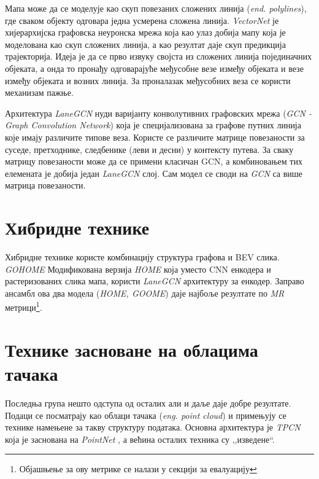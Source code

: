 \documentclass[11pt,oneside]{memoir}
\begin{document}
Мапа може да се моделује као скуп повезаних сложених линија (\textit{end. polylines}), где сваком објекту одговара једна усмерена сложена линија. 
\textit{VectorNet} је хијерархијска графовска неуронска мрежа која као улаз добија мапу која је моделована као скуп 
сложених линија, а као резултат даје скуп предикција трајекторија. Идеја је да се прво извуку својста из сложених 
линија појединачних објеката, а онда то пронађу одговарајуће међусобне везе између објеката и везе између објеката и возних линија. 
За проналазак међусобних веза се користи механизам пажње. \cite{attention_is_all_you_need} \cite{vectornet} 

Архитектура \textit{LaneGCN} нуди варијанту конволутивних графовских мрежа (\textit{GCN - Graph Convolution Network}) 
која је специјализована за графове путних линија које имају различите типове веза. Користе се различите матрице
повезаности за суседе, претходнике, следбенике (леви и десни) у контексту путева. За сваку матрицу повезаности може да се примени класичан GCN, а
комбиновањем тих елемената је добија један \textit{LaneGCN} слој. \cite{lanegcn} Сам модел се своди на \textit{GCN} са више матрица повезаности.

\section{Хибридне технике}

Хибридне технике користе комбинацију структура графова и BEV слика. \textit{GOHOME} Модификована верзија \textit{HOME} која уместо
CNN енкодера и растеризованих слика мапа, користи \textit{LaneGCN} архитектуру за енкодер. Заправо ансамбл ова два модела (\textit{HOME, GOOME})
даје најбоље резултате по \textit{MR} метрици\footnote{Објашњење за ову метрике се налази у секцији за евалуацију}.

\section{Технике засноване на облацима тачака}

Последња група нешто одступа од осталих али и даље даје добре резултате. Подаци се посматрају као облаци тачака (\textit{eng. point cloud}) 
и примењују се технике намењене за такву структуру података. Основна
архитектура је \textit{TPCN} \cite{tpcn} која је заснована на \textit{PointNet} \cite{pointnet}, а већина осталих техника су ,,изведене``.

\end{document}
